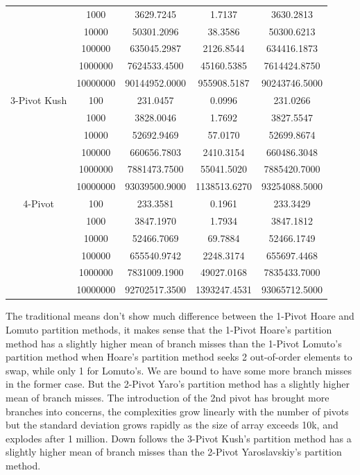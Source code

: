 \documentclass{article}
\begin{document}
\begin{center}
\begin{tabular}{ |c c | c c c| }
                        & 1000     & 3629.7245      & 1.7137        & 3630.2813 \\
                        & 10000    & 50301.2096     & 38.3586       & 50300.6213 \\
                        & 100000   & 635045.2987    & 2126.8544     & 634416.1873 \\
                        & 1000000  & 7624533.4500   & 45160.5385    & 7614424.8750 \\
                        & 10000000 & 90144952.0000  & 955908.5187   & 90243746.5000 \\
        \hline
        3-Pivot Kush    & 100      & 231.0457       & 0.0996        & 231.0266 \\
                        & 1000     & 3828.0046      & 1.7692        & 3827.5547 \\
                        & 10000    & 52692.9469     & 57.0170       & 52699.8674 \\
                        & 100000   & 660656.7803    & 2410.3154     & 660486.3048 \\
                        & 1000000  & 7881473.7500   & 55041.5020    & 7885420.7000 \\
                        & 10000000 & 93039500.9000  & 1138513.6270  & 93254088.5000 \\
        \hline
        4-Pivot         & 100      & 233.3581       & 0.1961        & 233.3429 \\
                        & 1000     & 3847.1970      & 1.7934        & 3847.1812 \\
                        & 10000    & 52466.7069     & 69.7884       & 52466.1749 \\
                        & 100000   & 655540.9742    & 2248.3174     & 655697.4468 \\
                        & 1000000  & 7831009.1900   & 49027.0168    & 7835433.7000 \\
                        & 10000000 & 92702517.3500  & 1393247.4531  & 93065712.5000 \\
        \hline
    \end{tabular}
\end{center}

The traditional means don't show much difference between the 1-Pivot Hoare and Lomuto partition methods,
it makes sense that the 1-Pivot Hoare's partition method has a slightly higher mean of branch misses than the 1-Pivot Lomuto's partition method
when Hoare's partition method seeks 2 out-of-order elements to swap, while only 1 for Lomuto's. We are bound to have some more branch misses in the former case.
But the 2-Pivot Yaro's partition method has a slightly higher mean of branch misses. The introduction of the 2nd pivot has brought more branches into concerns,
the complexities grow linearly with the number of pivots but the standard deviation grows rapidly as the size of array exceeds 10k, and explodes after 1 million.
Down follows the 3-Pivot Kush's partition method has a slightly higher mean of branch misses than the 2-Pivot Yaroslavskiy's partition method.
\end{document}
